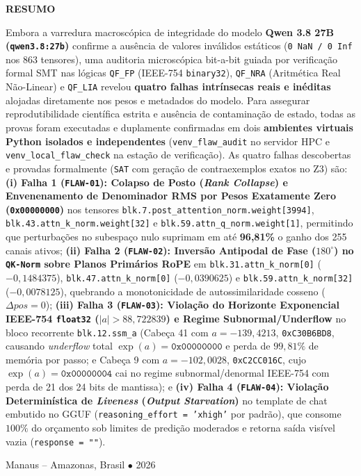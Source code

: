 \documentclass[11pt,a4paper]{article}
\theoremstyle{definition}
\begin{document}
\begin{titlepage}
    \vspace{0.6cm}
    \begin{minipage}{0.98\textwidth}
        \footnotesize
        \begin{center}\textbf{RESUMO}\end{center}
        \noindent Embora a varredura macroscópica de integridade do modelo \textbf{Qwen 3.8 27B (\texttt{qwen3.8:27b})} confirme a ausência de valores inválidos estáticos (\texttt{0 NaN / 0 Inf} nos 863 tensores), uma auditoria microscópica bit-a-bit guiada por verificação formal SMT nas lógicas \texttt{QF\_FP} (IEEE-754 \texttt{binary32}), \texttt{QF\_NRA} (Aritmética Real Não-Linear) e \texttt{QF\_LIA} revelou \textbf{quatro falhas intrínsecas reais e inéditas} alojadas diretamente nos pesos e metadados do modelo. Para assegurar reprodutibilidade científica estrita e ausência de contaminação de estado, todas as provas foram executadas e duplamente confirmadas em dois \textbf{ambientes virtuais Python isolados e independentes} (\texttt{venv\_flaw\_audit} no servidor HPC e \texttt{venv\_local\_flaw\_check} na estação de verificação). As quatro falhas descobertas e provadas formalmente (\texttt{SAT} com geração de contraexemplos exatos no Z3) são: \textbf{(i) Falha 1 (\texttt{FLAW-01}): Colapso de Posto (\textit{Rank Collapse}) e Envenenamento de Denominador RMS por Pesos Exatamente Zero (\texttt{0x00000000})} nos tensores \texttt{blk.7.post\_attention\_norm.weight[3994]}, \texttt{blk.43.attn\_k\_norm.weight[32]} e \texttt{blk.59.attn\_q\_norm.weight[1]}, permitindo que perturbações no subespaço nulo suprimam em até \textbf{96,81\%} o ganho dos 255 canais ativos; \textbf{(ii) Falha 2 (\texttt{FLAW-02}): Inversão Antipodal de Fase ($180^\circ$) no \texttt{QK-Norm} sobre Planos Primários RoPE} em \texttt{blk.31.attn\_k\_norm[0]} ($-0{,}1484375$), \texttt{blk.47.attn\_k\_norm[0]} ($-0{,}0390625$) e \texttt{blk.59.attn\_k\_norm[32]} ($-0{,}0078125$), quebrando a monotonicidade de autossimilaridade cosseno ($\Delta pos = 0$); \textbf{(iii) Falha 3 (\texttt{FLAW-03}): Violação do Horizonte Exponencial IEEE-754 \texttt{float32} ($|a| > 88{,}722839$) e Regime Subnormal/Underflow} no bloco recorrente \texttt{blk.12.ssm\_a} (Cabeça 41 com $a = -139{,}4213$, \texttt{0xC30B6BD8}, causando \textit{underflow} total $\exp(a) = \texttt{0x00000000}$ e perda de $99{,}81\%$ de memória por passo; e Cabeça 9 com $a = -102{,}0028$, \texttt{0xC2CC016C}, cujo $\exp(a) = \texttt{0x00000004}$ cai no regime subnormal/denormal IEEE-754 com perda de 21 dos 24 bits de mantissa); e \textbf{(iv) Falha 4 (\texttt{FLAW-04}): Violação Determinística de \textit{Liveness} (\textit{Output Starvation})} no template de chat embutido no GGUF (\texttt{reasoning\_effort = 'xhigh'} por padrão), que consome $100\%$ do orçamento sob limites de predição moderados e retorna saída visível vazia (\texttt{response = ""}).
    \end{minipage}
    
    \vfill
    {\small Manaus -- Amazonas, Brasil $\bullet$ 2026 \par}
\end{titlepage}
\end{document}
